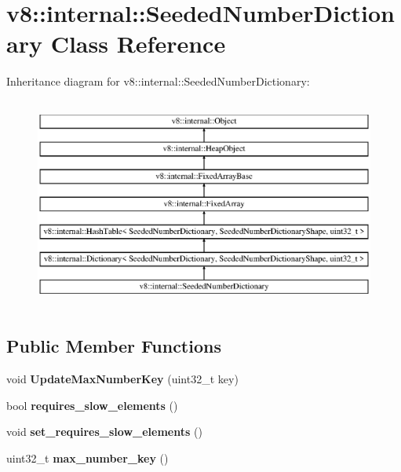 \hypertarget{classv8_1_1internal_1_1_seeded_number_dictionary}{}\section{v8\+:\+:internal\+:\+:Seeded\+Number\+Dictionary Class Reference}
\label{classv8_1_1internal_1_1_seeded_number_dictionary}
Inheritance diagram for v8\+:\+:internal\+:\+:Seeded\+Number\+Dictionary\+:\begin{figure}[H]
\begin{center}
\leavevmode
\includegraphics[height=7.000000cm]{classv8_1_1internal_1_1_seeded_number_dictionary}
\end{center}
\end{figure}
\subsection*{Public Member Functions}
\begin{DoxyCompactItemize}
\item 
\hypertarget{classv8_1_1internal_1_1_seeded_number_dictionary_ab01d01604f31a2ebacde8233dce945b1}{}void {\bfseries Update\+Max\+Number\+Key} (uint32\+\_\+t key)\label{classv8_1_1internal_1_1_seeded_number_dictionary_ab01d01604f31a2ebacde8233dce945b1}

\item 
\hypertarget{classv8_1_1internal_1_1_seeded_number_dictionary_a6a80262dbabab079434e9260e8c7a1eb}{}bool {\bfseries requires\+\_\+slow\+\_\+elements} ()\label{classv8_1_1internal_1_1_seeded_number_dictionary_a6a80262dbabab079434e9260e8c7a1eb}

\item 
\hypertarget{classv8_1_1internal_1_1_seeded_number_dictionary_a729972b015f11fc83ba6eb0efbd233ca}{}void {\bfseries set\+\_\+requires\+\_\+slow\+\_\+elements} ()\label{classv8_1_1internal_1_1_seeded_number_dictionary_a729972b015f11fc83ba6eb0efbd233ca}

\item 
\hypertarget{classv8_1_1internal_1_1_seeded_number_dictionary_ab5445b91af5175746651684b44a4dd9f}{}uint32\+\_\+t {\bfseries max\+\_\+number\+\_\+key} ()\label{classv8_1_1internal_1_1_seeded_number_dictionary_ab5445b91af5175746651684b44a4dd9f}

\end{DoxyCompactItemize}
